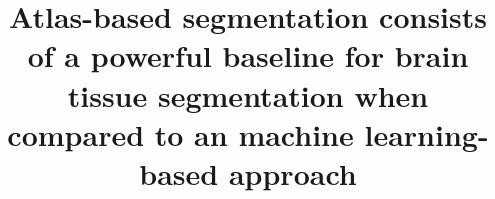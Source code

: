 \documentclass[conference]{IEEEtran}
\begin{document}
\title{Atlas-based segmentation consists of a powerful baseline for brain tissue segmentation when compared to an machine learning-based approach}

\author{
\and
{}
\and
{}
}

\maketitle

\begin{abstract}

\end{abstract}









\end{document}
